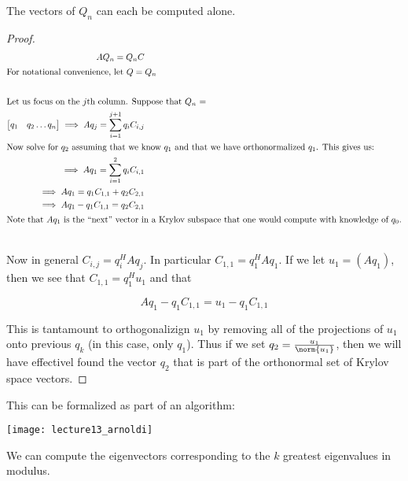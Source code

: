 \documentclass[../main.tex]{subfiles}
\begin{document}
\begin{proposition}
    The vectors of $Q_n$ can each be computed alone.
\end{proposition}
\begin{proof}
    \begin{align*}
        AQ_n = Q_nC \\
        \intertext{For notational convenience, let $Q =Q_n$} \\
        \intertext{Let us focus on the $j$th column. Suppose that $Q_n$ = }
            \begin{bmatrix}
                q_1 & q_2 \dots q_n
            \end{bmatrix}
            \implies Aq_j = \sum_{i=1}^{j+1}q_{i}C_{i,j} \\
            \intertext{Now solve for $q_2$ assuming that we know $q_1$ and that we have orthonormalized $q_1$. This gives us:}
            \implies Aq_1 = \sum_{i=1}^{2}q_{i}C_{i,1} \\
            \implies Aq_1 = q_{1}C_{1,1} + q_{2}C_{2,1} \\
            \implies Aq_1 - q_{1}C_{1,1} = q_{2}C_{2,1} \\
            \intertext{Note that $Aq_1$ is the ``next'' vector in a Krylov subspace that one would compute with knowledge of $q_0$.} \\
    \end{align*}

    Now in general $C_{i,j} = q_i^HAq_j$. In particular $C_{1,1} = q_1^HAq_1$. If we let $u_1 = (Aq_1)$, then we see that $C_{1,1} = q_1^H u_1$ and that 

    \[
        Aq_1 - q_{1}C_{1,1} = u_1 - q_{1} C_{1,1}
    \]

    This is tantamount to orthogonalizign $u_1$ by removing all of the projections of $u_1$ onto previous $q_k$ (in this case, only $q_1$). Thus if we set $q_2 = \frac{u_1}{\norm{u_1}}$, then we will have effectivel found the vector $q_2$ that is part of the orthonormal set of Krylov space vectors.
\end{proof}

\begin{remark}
    This can be formalized as part of an algorithm:

    \texttt{[image: lecture13\_arnoldi]}
\end{remark}

\begin{proposition}
    We can compute the eigenvectors corresponding to the $k$ greatest eigenvalues in modulus.
\end{proposition}
\end{document}
